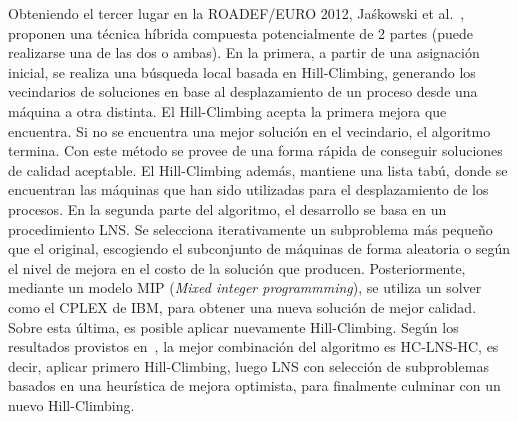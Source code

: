 \documentclass[../informe2.tex]{subfiles}
\begin{document}
Obteniendo el tercer lugar en la ROADEF/EURO 2012, Jaśkowski et al.~\cite{jaskowskihybrid}, proponen una técnica híbrida compuesta potencialmente de 2 partes (puede realizarse una de las dos o ambas). En la primera, a partir de una asignación inicial, se realiza una búsqueda local basada en Hill-Climbing, generando los vecindarios de soluciones en base al desplazamiento de un proceso desde una máquina a otra distinta. El Hill-Climbing acepta la primera mejora que encuentra. Si no se encuentra una mejor solución en el vecindario, el algoritmo termina. Con este método se provee de una forma rápida de conseguir soluciones de calidad aceptable. El Hill-Climbing además, mantiene una lista tabú, donde se encuentran las máquinas que han sido utilizadas para el desplazamiento de los procesos. En la segunda parte del algoritmo, el desarrollo se basa en un procedimiento LNS. Se selecciona iterativamente un subproblema más pequeño que el original, escogiendo el subconjunto de máquinas de forma aleatoria o según el nivel de mejora en el costo de la solución que producen. Posteriormente, mediante un modelo MIP (\emph{Mixed integer programmming}), se utiliza un solver como el CPLEX de IBM, para obtener una nueva solución de mejor calidad. Sobre esta última, es posible aplicar nuevamente Hill-Climbing. Según los resultados provistos en~\cite{jaskowskihybrid}, la mejor combinación del algoritmo es HC-LNS-HC, es decir, aplicar primero Hill-Climbing, luego LNS con selección de subproblemas basados en una heurística de mejora optimista, para finalmente culminar con un nuevo Hill-Climbing. \\
\end{document}
